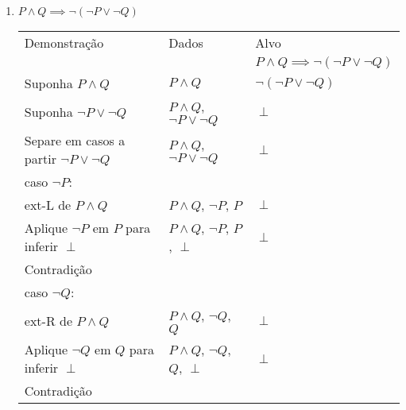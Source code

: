 \documentclass[a4paper, 12pt]{article}
\begin{document}
\begin{enumerate}
\begin{enumerate}[1.]
        \newpage
        \item $P \land Q \implies \neg(\neg P \lor \neg Q)$
        \begin{table}[h!]
            \centering
            \begin{tabular}{|p{4cm} | p{4cm} | p{4cm} |}
            \rowcolor{gray!50}
            Demonstração & Dados & Alvo \\
            & & $P \land Q \implies \neg(\neg P \lor \neg Q)$\\
            Suponha $P \land Q$ & $P \land Q$ & $\neg (\neg P \lor \neg Q)$\\
            Suponha $\neg P \lor \neg Q$ & $P \land Q$, $\neg P \lor \neg Q$ & $\perp$ \\
            Separe em casos a partir $\neg P \lor \neg Q$ & $P \land Q$, $\neg P \lor \neg Q$ & $\perp$ \\
            \hline
            caso $\neg P$: & & \\
            ext-L de $P \land Q$ & $P \land Q$, $\neg P$, $P$ & $\perp$ \\
            Aplique $\neg P$ em $P$ para inferir $\perp$ & $P \land Q$, $\neg P$, $P$, $\perp$ & $\perp$ \\
            Contradição & & \\
            \hline
            caso $\neg Q$: & & \\
            ext-R de $P \land Q$ & $P \land Q$, $\neg Q$, $Q$ & $\perp$ \\
            Aplique $\neg Q$ em $Q$ para inferir $\perp$ & $P \land Q$, $\neg Q$, $Q$, $\perp$ & $\perp$ \\
            Contradição & & \\
            \hline
            \end{tabular}
        \end{table}


\end{enumerate}
\end{enumerate}
\end{document}
